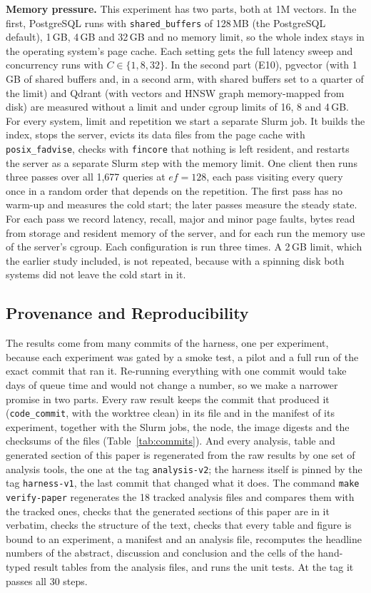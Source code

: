 \documentclass[preprint,12pt]{elsarticle}
\begin{document}
\textbf{Memory pressure.} This experiment has two parts, both at 1M vectors. In the
first, PostgreSQL runs with \texttt{shared\_buffers} of 128\,MB (the PostgreSQL
default), 1\,GB, 4\,GB and 32\,GB and no memory limit, so the whole index stays in the
operating system's page cache. Each setting gets the full latency sweep and concurrency
runs with $C\in\{1,8,32\}$. In the second part (E10), pgvector (with 1\,GB of shared buffers and, in a second
arm, with shared buffers set to a quarter of the limit) and Qdrant (with vectors and HNSW
graph memory-mapped from disk) are measured without a limit and under cgroup limits of 16,
8 and 4\,GB. For every system, limit and repetition we start a separate Slurm job. It builds
the index, stops the server, evicts its data files from the page cache with
\texttt{posix\_fadvise}, checks with \texttt{fincore} that nothing is left resident, and
restarts the server as a separate Slurm step with the memory limit. One client then runs
three passes over all 1{,}677 queries at $ef=128$, each pass visiting every query once in
a random order that depends on the repetition. The first pass has no warm-up and measures
the cold start; the later passes measure the steady state. For each pass we record
latency, recall, major and minor page faults, bytes read from storage and resident memory
of the server, and for each run the memory use of the server's cgroup. Each configuration
is run three times. A 2\,GB limit, which the earlier study included, is not repeated,
because with a spinning disk both systems did not leave the cold start in it.

\subsection{Provenance and Reproducibility}
\label{sec:provenance}

The results come from many commits of the harness, one per experiment, because each experiment was gated by a smoke test, a pilot and a full run of the exact
commit that ran it. Re-running everything with one commit would take days of queue time and would not change a number, so we make a narrower promise in two parts.
Every raw result keeps the commit that produced it (\texttt{code\_commit}, with the worktree clean) in its file and in the manifest of its experiment, together with the Slurm jobs, the node,
the image digests and the checksums of the files (Table~\ref{tab:commits}). And every analysis, table and generated section of this paper is regenerated from the raw results by one set of
analysis tools, the one at the tag \texttt{analysis-v2}; the harness itself is pinned by the tag \texttt{harness-v1}, the last commit that changed what it does. The command \texttt{make verify-paper} regenerates the 18 tracked
analysis files and compares them with the tracked ones, checks that the generated sections of this paper are in it verbatim, checks the structure of the text, checks that every table and figure is bound to an experiment,
a manifest and an analysis file, recomputes the headline numbers of the abstract, discussion and conclusion and the cells of the hand-typed result tables from the analysis files, and runs the unit tests. At the tag it passes all 30 steps.
\end{document}

